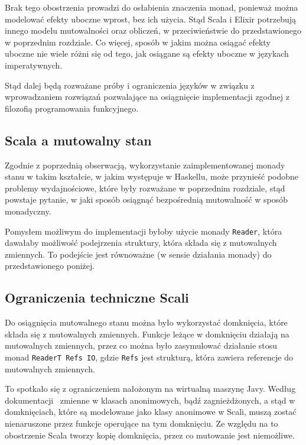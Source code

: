 \documentclass[../praca.tex]{subfiles}
\begin{document}
Brak tego obostrzenia prowadzi do osłabienia znaczenia monad, ponieważ
można modelować efekty uboczne wprost, bez ich użycia. Stąd Scala i Elixir
potrzebują innego modelu mutowalności oraz obliczeń, w przeciwieństwie
do przedstawionego w poprzednim rozdziale. Co więcej, sposób
w jakim można osiągać efekty uboczne nie wiele różni się
od tego, jak osiągane są efekty uboczne w językach imperatywnych.

Stąd dalej będą rozważane próby i ograniczenia języków w związku 
z wprowadzaniem rozwiązań pozwalające na osiągnięcie implementacji
zgodnej z filozofią programowania funkcyjnego.

\subsection{Scala a mutowalny stan}

Zgodnie z poprzednią obserwacją, wykorzystanie zaimplementowanej 
monady stanu w takim kształcie,
w jakim występuje w Haskellu, może przynieść podobne problemy wydajnościowe,
które były rozważane w poprzednim rozdziale, stąd powstaje pytanie, w jaki sposób
osiągnąć bezpośrednią mutowalność w sposób monadyczny.

Pomysłem możliwym do implementacji byłoby użycie monady \texttt{Reader}, która
dawałaby możliwość podejrzenia struktury, która składa się z mutowalnych zmiennych.
To podejście jest równoważne (w sensie działania monady) do przedstawionego poniżej.

\subsection{Ograniczenia techniczne Scali}

Do osiągnięcia mutowalnego stanu można było wykorzystać domknięcia, 
które składa się z mutowalnych
zmiennych. Funkcje leżące w domknięciu działają na mutowalnych zmiennych,
przez co można było zasymulować działanie stosu monad \texttt{ReaderT Refs IO},
gdzie \texttt{Refs} jest strukturą, która zawiera referencje do mutowalnych zmiennych.

To spotkało się z ograniczeniem nałożonym na wirtualną maszynę Javy. Według 
dokumentacji~\cite{Oracle:IC} zmienne w klasach anonimowych, bądź zagnieżdżonych, 
a stąd w domknięciach, które są modelowane jako klasy anonimowe w Scali, muszą zostać
nienaruszone przez funkcje operujące na tym domknięciu. 
Ze względu na to obostrzenie Scala tworzy kopię domknięcia, 
przez co mutowanie jest niemożliwe. 
\end{document}
